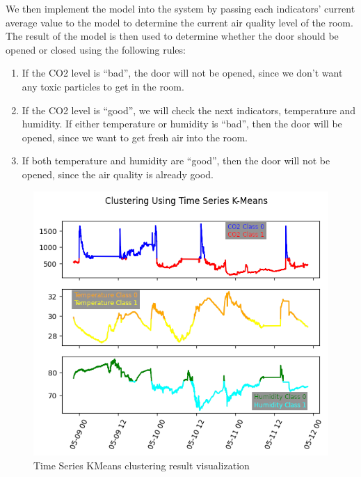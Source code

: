 We then implement the model into the system by passing each
indicators' current average value to the model to determine
the current air quality level of the room. The result of the
model is then used to determine whether the door should be
opened or closed using the following rules:
\begin{enumerate}
      \item If the CO2 level is ``bad'', the door will not be
            opened, since we don't want any toxic particles to
            get in the room.
      \item If the CO2 level is ``good'', we will check the
            next indicators, temperature and humidity. If
            either temperature or humidity is ``bad'', then the
            door will be opened, since we want to get fresh
            air into the room.
      \item If both temperature and humidity are ``good'',
            then the door will not be opened, since the air
            quality is already good.
\end{enumerate}


\begin{figure}
      \centerline{\includegraphics[scale=0.65]{resources/iot-clustering.png}}
      \caption{Time Series KMeans clustering result visualization}
      \label{kmeans}
\end{figure}